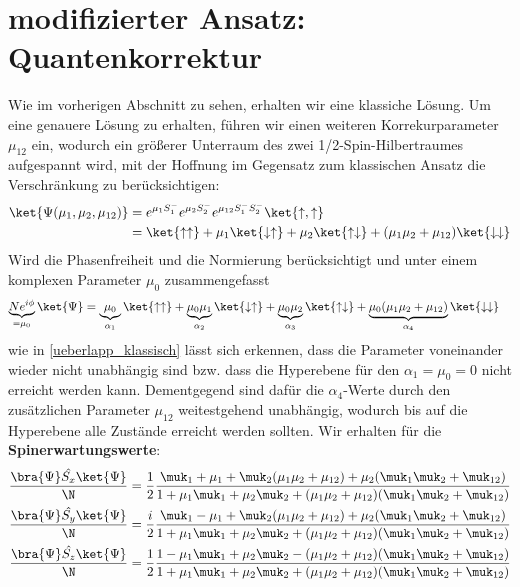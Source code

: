 












\section{modifizierter Ansatz: Quantenkorrektur}
\noindent Wie im vorherigen Abschnitt zu sehen, erhalten wir eine klassiche Lösung. Um eine genauere Lösung zu erhalten, 
führen wir einen weiteren Korrekurparameter $\mu_{12}$ ein, wodurch ein größerer Unterraum des zwei 1/2-Spin-Hilbertraumes aufgespannt 
wird, mit der Hoffnung im Gegensatz zum klassischen Ansatz die Verschränkung zu berücksichtigen:
\begin{align}
    \ket{\Psi(\mu_1,\mu_2,\mu_{12})} &= e^{\mu_1 S_1^-}e^{\mu_2 S_2^-}e^{\mu_{12} S_1^-S_2^-}\ket{\uparrow,\uparrow}\\
                                    &= \ket{\uparrow \uparrow} +\mu_1\ket{\downarrow \uparrow} + \mu_2\ket{\uparrow \downarrow} + (\mu_1\mu_2 + \mu_{12})\ket{\downarrow \downarrow}
\end{align}
Wird  die Phasenfreiheit und die Normierung berücksichtigt und unter einem komplexen Parameter $\mu_0$ zusammengefasst
\begin{align}
    \underbrace{Ne^{i\phi}}_{=\mu_0}\ket{\Psi} &= \underbrace{\mu_0}_{\alpha_1}\ket{\uparrow \uparrow} 
    + \underbrace{\mu_0\mu_1}_{\alpha_2}\ket{\downarrow \uparrow} + \underbrace{\mu_0\mu_2}_{\alpha_3}\ket{\uparrow \downarrow} 
    + \underbrace{\mu_0(\mu_1\mu_2 + \mu_{12})}_{\alpha_4}\ket{\downarrow\downarrow}
\end{align}
wie in \autoref{ueberlapp_klassisch} lässt sich erkennen, dass die Parameter voneinander wieder nicht unabhängig sind bzw. dass die 
Hyperebene für den $\alpha_1 = \mu_0 = 0$ nicht erreicht werden kann. Dementgegend sind dafür die $\alpha_4$-Werte durch den zusätzlichen 
Parameter $\mu_{12}$ weitestgehend unabhängig, wodurch bis auf die Hyperebene alle Zustände erreicht werden sollten.    
Wir erhalten für die \textbf{Spinerwartungswerte}:
\begin{align}
    \frac{\bra{\Psi}\hat{S_x}\ket{\Psi}}{\N} &= \frac{1}{2}\frac{\muk_1 + \mu_1 + \muk_2(\mu_1\mu_2 + \mu_{12}) + \mu_2(\muk_1\muk_2 + \muk_{12})}{1+\mu_1\muk_1 + \mu_2\muk_2 + (\mu_1\mu_2 + \mu_{12})(\muk_1\muk_2 + \muk_{12})} \\
    \frac{\bra{\Psi}\hat{S_y}\ket{\Psi}}{\N} &= \frac{i}{2}\frac{\muk_1 - \mu_1 + \muk_2(\mu_1\mu_2 + \mu_{12}) + \mu_2(\muk_1\muk_2 + \muk_{12})}{1+\mu_1\muk_1 + \mu_2\muk_2 + (\mu_1\mu_2 + \mu_{12})(\muk_1\muk_2 + \muk_{12})}\\
    \frac{\bra{\Psi}\hat{S_z}\ket{\Psi}}{\N} &= \frac{1}{2}\frac{1 - \mu_1\muk_1 + \mu_2\muk_2 - (\mu_1\mu_2 + \mu_{12})(\muk_1\muk_2 + \muk_{12})}{1 + \mu_1\muk_1 + \mu_2\muk_2 + (\mu_1\mu_2 + \mu_{12})(\muk_1\muk_2 + \muk_{12})}  
\end{align}
